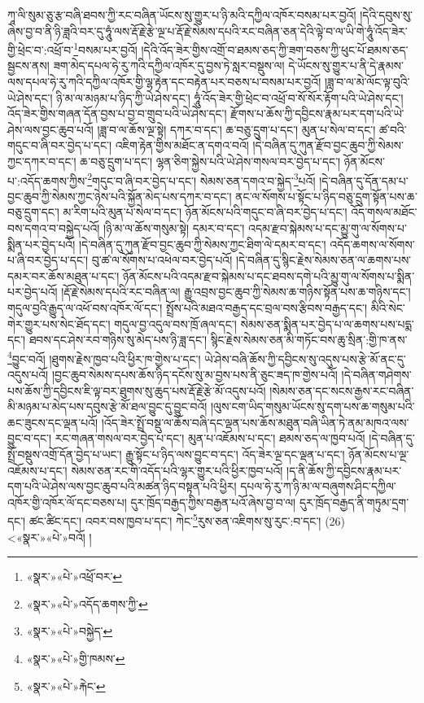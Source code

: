 ཀཱ་ལི་སུམ་ཅུ་རྩ་བཞི་ཐབས་ཀྱི་རང་བཞིན་ཡོངས་སུ་གྱུར་པ་ཉི་མའི་དཀྱིལ་འཁོར་བསམ་པར་བྱའོ། །དེའི་དབུས་སུ་ཞེས་བྱ་བ་ནི་ཉི་ཟླའི་བར་དུ་ཧཱུཾ་ལས་རྡོ་རྗེ་རྩེ་ལྔ་པ་རྡོ་རྗེ་སེམས་དཔའི་རང་བཞིན་ཅན་དེའི་ལྟེ་བ་ལ་ཡི་གེ་ཧཱུཾ་འོད་ཟེར་གྱི་ཕྲེང་བ་:འཕྲོ་བ་\footnote{«སྣར་»«པེ་»འཕྲོ་བར་}བསམ་པར་བྱའོ། །དེའི་འོད་ཟེར་གྱིས་འགྲོ་བ་ཐམས་ཅད་ཀྱི་ཟག་བཅས་ཀྱི་ཕུང་པོ་ཐམས་ཅད་སྦྱངས་ནས། ཟག་མེད་དཔལ་ཧེ་རུ་ཀའི་དཀྱིལ་འཁོར་དུ་བྱས་ཏེ་སླར་བསྡུས་ལ། དེ་ཡོངས་སུ་གྱུར་པ་ནི་དེ་རྣམས་ལས་དཔལ་ཧེ་རུ་ཀའི་དཀྱིལ་འཁོར་གྱི་ལྷ་རྟེན་དང་བརྟེན་པར་བཅས་པ་བསམ་པར་བྱའོ། །ཟླ་བ་ལ་མེ་ལོང་ལྟ་བུའི་ཡེ་ཤེས་དང་། ཉི་མ་ལ་མཉམ་པ་ཉིད་ཀྱི་ཡེ་ཤེས་དང་། ཧཱུཾ་འོད་ཟེར་གྱི་ཕྲེང་བ་འཕྲོ་བ་སོ་སོར་རྟོག་པའི་ཡེ་ཤེས་དང་། འོད་ཟེར་གྱིས་གཞན་དོན་བྱས་པ་བྱ་བ་གྲུབ་པའི་ཡེ་ཤེས་དང་། རྫོགས་པ་ཆོས་ཀྱི་དབྱིངས་རྣམ་པར་དག་པའི་ཡེ་ཤེས་ལས་བྱང་ཆུབ་པའོ། །ཟླ་བ་ལ་ཆོས་ལྔ་སྟེ། དཀར་བ་དང་། ཆ་བཅུ་དྲུག་པ་དང་། མུན་པ་སེལ་བ་དང་། ཚ་བའི་གདུང་བ་ཞི་བར་བྱེད་པ་དང་། འཇིག་རྟེན་གྱིས་མཐོང་ན་དགའ་བའོ། །དེ་བཞིན་དུ་ཀུན་རྫོབ་བྱང་ཆུབ་ཀྱི་སེམས་ཀྱང་དཀར་བ་དང་། ཆ་བཅུ་དྲུག་པ་དང་། ལྷན་ཅིག་སྐྱེས་པའི་ཡེ་ཤེས་གསལ་བར་བྱེད་པ་དང་། ཉོན་མོངས་པ་:འདོད་ཆགས་ཀྱིས་\footnote{«སྣར་»«པེ་»འདོད་ཆགས་ཀྱི་}གདུང་བ་ཞི་བར་བྱེད་པ་དང་། སེམས་ཅན་དགའ་བ་སྐྱེད་\footnote{«སྣར་»«པེ་»བསྐྱེད་}པའོ། །དེ་བཞིན་དུ་དོན་དམ་པ་བྱང་ཆུབ་ཀྱི་སེམས་ཀྱང་ཉེས་པའི་སྐྱོན་མེད་པས་དཀར་བ་དང་། ནང་ལ་སོགས་པ་སྟོང་པ་ཉིད་བཅུ་དྲུག་སྟོན་པས་ཆ་བཅུ་དྲུག་དང་། མ་རིག་པའི་མུན་པ་སེལ་བ་དང་། ཉོན་མོངས་པའི་གདུང་བ་ཞི་བར་བྱེད་པ་དང་། འོད་གསལ་མཐོང་བས་དགའ་བ་བསྐྱེད་པའོ། །ཉི་མ་ལ་ཆོས་གསུམ་སྟེ། དམར་བ་དང་། འདམ་རྫབ་སྐེམས་པ་དང་མྱུ་གུ་ལ་སོགས་པ་སྨིན་པར་བྱེད་པའོ། །དེ་བཞིན་དུ་ཀུན་རྫོབ་བྱང་ཆུབ་ཀྱི་སེམས་ཀྱང་ཐིག་ལེ་དམར་བ་དང་། འདོད་ཆགས་ལ་སོགས་པ་ཞི་བར་བྱེད་པ་དང་། བུ་ཚ་ལ་སོགས་པ་འཕེལ་བར་བྱེད་པའོ། །དེ་བཞིན་དུ་སྙིང་རྗེས་སེམས་ཅན་ལ་ཆགས་པས་དམར་བར་ཆོས་མཐུན་པ་དང་། ཉོན་མོངས་པའི་འདམ་རྫབ་སྐེམས་པ་དང་ཐབས་དགེ་པའི་མྱུ་གུ་ལ་སོགས་པ་སྨིན་པར་བྱེད་པའོ། །རྡོ་རྗེ་སེམས་དཔའི་རང་བཞིན་ལ། རྒྱུ་འབྲས་བྱང་ཆུབ་ཀྱི་སེམས་ཆ་གཉིས་སྟོན་པས་ཆ་གཉིས་དང་། གདུལ་བྱའི་རྒྱུད་ལ་འཕོ་བས་འཁོར་ལོ་དང་། སྤྲོས་པའི་མཐའ་བརྒྱད་དང་བྲལ་བས་རྩིབས་བརྒྱད་དང་། མིའི་སེང་གེར་གྱུར་པས་སེང་ཐོད་དང་། གདུལ་བྱ་འདུལ་བས་ཁྲོ་ཞལ་དང་། སེམས་ཅན་སྨིན་པར་བྱེད་པ་ལ་ཆགས་པས་པདྨ་དང་། ཐབས་དང་ཤེས་རབ་གཉིས་སུ་མེད་པས་ཉི་ཟླ་དང་། སྙིང་རྗེས་སེམས་ཅན་མི་གཏོང་བས་ཆུ་སྲིན་:གྱི་ཁ་ནས་\footnote{«སྣར་»«པེ་»གྱི་ཁམས་}བྱུང་བའོ། །ཐུགས་རྗེས་ཁྱབ་པའི་ཕྱིར་ཁ་གྱེས་པ་དང་། ཡེ་ཤེས་བཞི་ཆོས་ཀྱི་དབྱིངས་སུ་འདུས་པས་རྩེ་མོ་ནང་དུ་འདུས་པའོ། །བྱང་ཆུབ་སེམས་དཔས་ཆོས་ཉིད་དངོས་སུ་མ་བྱས་པས་ནི་ཅུང་ཟད་ཁ་གྱེས་པའོ། །དེ་བཞིན་གཤེགས་པས་ཆོས་ཀྱི་དབྱིངས་ཇི་ལྟ་བར་ཐུགས་སུ་ཆུད་པས་རྡོ་རྗེ་རྩེ་མོ་འདུས་པའོ། །སེམས་ཅན་དང་སངས་རྒྱས་རང་བཞིན་མི་མཉམ་པ་མེད་པས་དབུས་རྩེ་མོ་ཐལ་བྱུང་དུ་བྱུང་བའོ། །ལུས་ངག་ཡིད་གསུམ་ཡོངས་སུ་དག་པས་ཆ་གསུམ་པའི་ཆང་ཟུངས་དང་ལྡན་པའོ། །འོད་ཟེར་སྤྲོ་བསྡུ་ལ་ཆོས་བཞི་དང་ལྡན་པས་ཆོས་མཐུན་བཞི་ཡིན་ཏེ་ནམ་མཁའ་ལས་བྱུང་བ་དང་། རང་གཞན་གསལ་བར་བྱེད་པ་དང་། མུན་པ་འཇོམས་པ་དང་། ཐམས་ཅད་ལ་ཁྱབ་པའོ། །དེ་བཞིན་དུ་སྤྲོ་བསྡུས་འགྲོ་དོན་བྱེད་པ་ཡང་། རྒྱུ་སྟོང་པ་ཉིད་ལས་བྱུང་བ་དང་། འོད་ཟེར་ལྔ་དང་ལྡན་པ་དང་། ཉོན་མོངས་པ་ལྔ་འཇོམས་པ་དང་། སེམས་ཅན་རང་གི་འདོད་པའི་ལྷར་གྱུར་པའི་ཕྱིར་ཁྱབ་པའོ། །ད་ནི་ཆོས་ཀྱི་དབྱིངས་རྣམ་པར་དག་པའི་ཡེ་ཤེས་ལས་བྱང་ཆུབ་པའི་མཚན་ཉིད་བསྟན་པའི་ཕྱིར། དཔལ་ཧེ་རུ་ཀ་ཉི་མ་ལ་བཞུགས་ཤིང་དཀྱིལ་འཁོར་གྱི་འཁོར་ལོ་དང་བཅས་པ། དུར་ཁྲོད་བརྒྱད་ཀྱིས་བརྒྱན་པའོ་ཞེས་བྱ་བ་ལ། དུར་ཁྲོད་བརྒྱད་ནི་གཏུམ་དྲག་དང་། ཚང་ཚིང་དང་། འབར་བས་ཁྱབ་པ་དང་། ཀེང་\footnote{«སྣར་»«པེ་»རྐེང་}རུས་ཅན་འཇིགས་སུ་རུང་:བ་དང་། (26) <«སྣར་»«པེ་»བའོ། །
